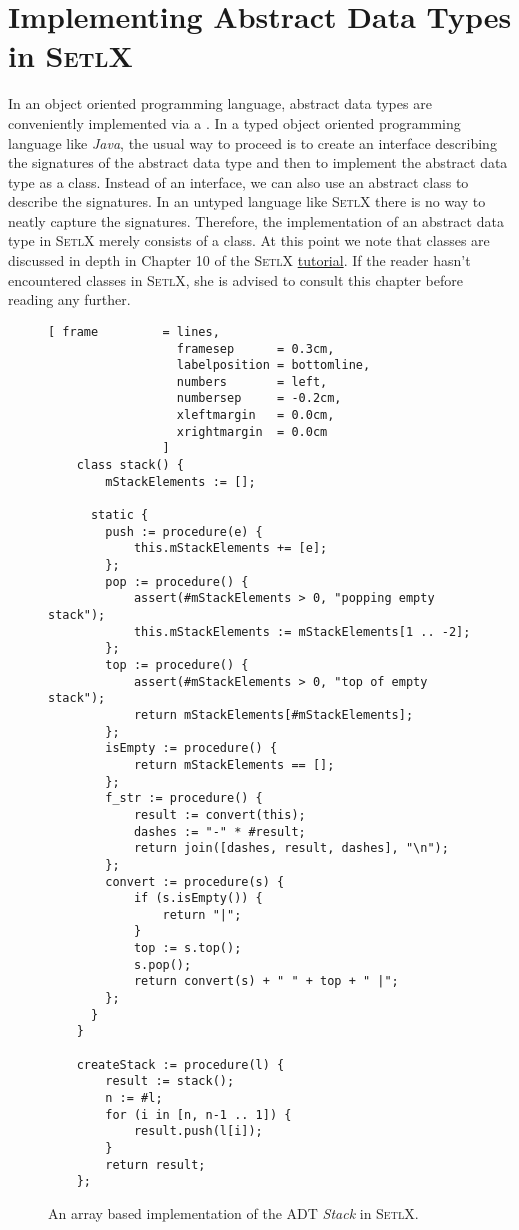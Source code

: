 \section[Implementation]{Implementing Abstract Data Types in \textsc{SetlX}}
In an object oriented programming language, abstract data types are conveniently implemented via a
.  In a typed object oriented programming language like \textsl{Java}, the usual way to proceed
is to create an interface describing the signatures of the abstract data type and then to implement
the abstract data type as a class.  Instead of an interface, we can also use an abstract class
to describe the signatures.  In an untyped language like \textsc{SetlX} there is no way to
neatly capture the signatures.  Therefore, the implementation of an abstract data type in
\textsc{SetlX} merely consists of a class.
At this point we note that classes are discussed in depth in Chapter 10 of the \textsc{SetlX} 
\href{http://download.randoom.org/setlX/tutorial.pdf}{tutorial}.  If the reader
hasn't encountered classes in \textsc{SetlX}, she is advised to consult this chapter before reading
any further. 

\begin{figure}[!h]
  \centering
\begin{Verbatim}[ frame         = lines, 
                  framesep      = 0.3cm, 
                  labelposition = bottomline,
                  numbers       = left,
                  numbersep     = -0.2cm,
                  xleftmargin   = 0.0cm,
                  xrightmargin  = 0.0cm
                ]
    class stack() {
        mStackElements := [];
    
      static {  
        push := procedure(e) {
            this.mStackElements += [e];
        };
        pop := procedure() {
            assert(#mStackElements > 0, "popping empty stack");
            this.mStackElements := mStackElements[1 .. -2];
        };
        top := procedure() {
            assert(#mStackElements > 0, "top of empty stack");
            return mStackElements[#mStackElements];
        };
        isEmpty := procedure() {
            return mStackElements == [];
        };
        f_str := procedure() {
            result := convert(this);
            dashes := "-" * #result;
            return join([dashes, result, dashes], "\n");
        };
        convert := procedure(s) {
            if (s.isEmpty()) {
                return "|";
            } 
            top := s.top();
            s.pop();
            return convert(s) + " " + top + " |";
        };
      }
    }
    
    createStack := procedure(l) {
        result := stack();
        n := #l;
        for (i in [n, n-1 .. 1]) {
            result.push(l[i]);
        }
        return result;
    };
\end{Verbatim}
\vspace*{-0.3cm}
  \caption{An array based implementation of the ADT \textsl{Stack} in \textsc{SetlX}.}
  \label{fig:stack-array.stlx}
\end{figure} 

